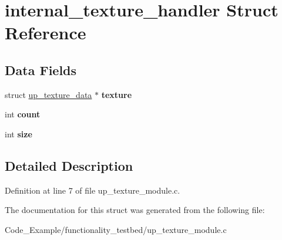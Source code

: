 \hypertarget{structinternal__texture__handler}{}\section{internal\+\_\+texture\+\_\+handler Struct Reference}
\label{structinternal__texture__handler}
\subsection*{Data Fields}
\begin{DoxyCompactItemize}
\item 
\hypertarget{structinternal__texture__handler_a061703cb376019a4fe560c8f7ea73a5d}{}struct \hyperlink{structup__texture__data}{up\+\_\+texture\+\_\+data} $\ast$ {\bfseries texture}\label{structinternal__texture__handler_a061703cb376019a4fe560c8f7ea73a5d}

\item 
\hypertarget{structinternal__texture__handler_ad43c3812e6d13e0518d9f8b8f463ffcf}{}int {\bfseries count}\label{structinternal__texture__handler_ad43c3812e6d13e0518d9f8b8f463ffcf}

\item 
\hypertarget{structinternal__texture__handler_a439227feff9d7f55384e8780cfc2eb82}{}int {\bfseries size}\label{structinternal__texture__handler_a439227feff9d7f55384e8780cfc2eb82}

\end{DoxyCompactItemize}


\subsection{Detailed Description}


Definition at line 7 of file up\+\_\+texture\+\_\+module.\+c.



The documentation for this struct was generated from the following file\+:\begin{DoxyCompactItemize}
\item 
Code\+\_\+\+Example/functionality\+\_\+testbed/up\+\_\+texture\+\_\+module.\+c\end{DoxyCompactItemize}
